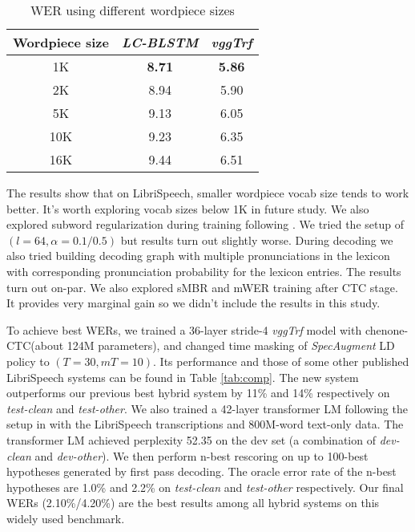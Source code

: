 \documentclass[a4paper]{article}
\begin{document}
\vspace{-0.5em}
\begin{table}[htb]
    \centering
    \caption{WER using different wordpiece sizes}
    \begin{tabular}{|c|cc|}
    \hline
    Wordpiece size & \emph{LC-BLSTM} & \emph{vggTrf} \\
    \hline\hline
    1K & \textbf{8.71} & \textbf{5.86} \\
    2K & 8.94 & 5.90 \\
    5K & 9.13 & 6.05 \\
    10K & 9.23 & 6.35 \\
    16K & 9.44 & 6.51 \\
    \hline
    \end{tabular}
    \label{tab:wp_sizes}
\end{table}
\vspace{-0.5em}

The results show that on LibriSpeech, smaller wordpiece vocab size tends to work better. It's worth exploring vocab sizes below 1K in future study. We also explored subword regularization during training following \cite{kudo2018subword}. We tried the setup of $(l=64, \alpha=0.1/0.5)$ but results turn out slightly worse. During decoding we also tried building decoding graph with multiple pronunciations in the lexicon with corresponding pronunciation probability for the lexicon entries. The results turn out on-par. We also explored sMBR and mWER training after CTC stage. It provides very marginal gain so we didn't include the results in this study. 

To achieve best WERs, we trained a 36-layer stride-4 \emph{vggTrf} model with chenone-CTC(about 124M parameters), and changed time masking of \emph{SpecAugment} LD policy to $(T=30, mT=10)$. Its performance and those of some other published LibriSpeech systems can be found in Table \ref{tab:comp}. The new system outperforms our previous best hybrid system\cite{wang2019transformerbased} by 11\% and 14\% respectively on \emph{test-clean} and \emph{test-other}. We also trained a 42-layer transformer LM following the setup in\cite{Irie_2019} with the LibriSpeech transcriptions and 800M-word text-only data. The transformer LM achieved perplexity 52.35 on the dev set (a combination of \emph{dev-clean} and \emph{dev-other}). We then perform n-best rescoring on up to 100-best hypotheses generated by first pass decoding. The oracle error rate of the n-best hypotheses are 1.0\% and 2.2\% on \emph{test-clean} and \emph{test-other} respectively. Our final WERs (2.10\%/4.20\%) are the best results among all hybrid systems on this widely used benchmark.
\end{document}
